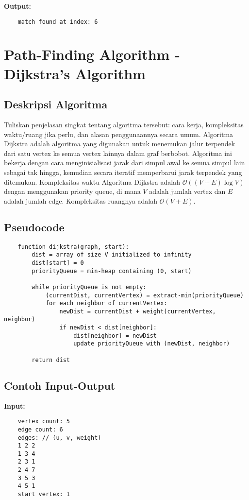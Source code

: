 \textbf{Output:}
\begin{verbatim}
    match found at index: 6
\end{verbatim}

\section{Path-Finding Algorithm - Dijkstra's Algorithm}
\label{sec:dijkstra-implementation}

\subsection{Deskripsi Algoritma}
Tuliskan penjelasan singkat tentang algoritma tersebut: cara kerja, kompleksitas waktu/ruang jika perlu, dan alasan penggunaannya secara umum.
Algoritma Dijkstra adalah algoritma yang digunakan untuk menemukan jalur terpendek dari satu vertex ke semua vertex lainnya dalam graf berbobot. Algoritma ini bekerja dengan cara menginisialisasi jarak dari simpul awal ke semua simpul lain sebagai tak hingga, kemudian secara iteratif memperbarui jarak terpendek yang ditemukan. Kompleksitas waktu Algoritma Dijkstra adalah $\mathcal{O}\left((V + E) \log V\right)$ dengan menggunakan priority queue, di mana $V$ adalah jumlah vertex dan $E$ adalah jumlah edge. Kompleksitas ruangnya adalah $\mathcal{O}\left(V + E\right)$.

\subsection{Pseudocode}
\begin{verbatim}
    function dijkstra(graph, start):
        dist = array of size V initialized to infinity
        dist[start] = 0
        priorityQueue = min-heap containing (0, start)

        while priorityQueue is not empty:
            (currentDist, currentVertex) = extract-min(priorityQueue)
            for each neighbor of currentVertex:
                newDist = currentDist + weight(currentVertex, neighbor)
                if newDist < dist[neighbor]:
                    dist[neighbor] = newDist
                    update priorityQueue with (newDist, neighbor)

        return dist
\end{verbatim}

\subsection{Contoh Input-Output}
\textbf{Input:}
\begin{verbatim}
    vertex count: 5
    edge count: 6
    edges: // (u, v, weight)
    1 2 2
    1 3 4
    2 3 1
    2 4 7
    3 5 3
    4 5 1
    start vertex: 1
\end{verbatim}


